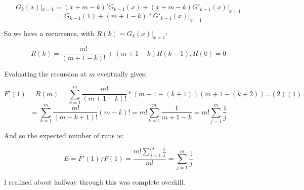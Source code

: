 \documentclass{article}
\begin{document}
$$G_k(x)|_{x = 1} = (x+m-k)' G_{k-1}(x) + (x+m-k)G'_{k-1}(x)|_{x = 1}$$
$$= G_{k-1}(1) + (m+1-k)*G'_{k-1}(x)|_{x = 1}$$

So we have a recurrence, with $R(k) = G_{k}(x)|_{x = 1}$:

$$R(k) = \frac{m!}{(m+1-k)!} + (m+1-k)R(k-1),   R(0) = 0$$

Evaluating the recursion at $m$ eventually gives:

$$F'(1) = R(m) = \sum_{k = 1}^{m} \frac{m!}{(m+1-k)!}*(m+1-(k+1))(m+1-(k+2))...(2)(1)$$
$$= \sum_{k = 1}^{m} \frac{m!}{(m-k+1)!}(m-k)! = m!\sum_{k = 1}^{m}\frac{1}{m+1-k} = m!\sum_{j = 1}^{m}\frac{1}{j}$$

And so the expected number of runs is:

$$E = F'(1)/F(1) = \frac{m!\sum_{j = 1}^{m}\frac{1}{j}}{m!} = \sum_{j = 1}^{m}\frac{1}{j} $$

I realized about halfway through this was complete overkill. 
\end{document}
